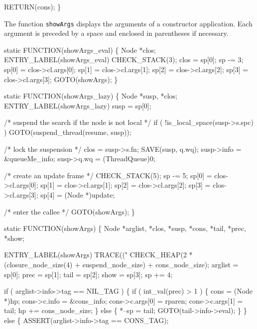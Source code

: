     RETURN(cons);
\}

\nwendcode{}\nwdocspar
The function \texttt{showArgs} displays the arguments of a constructor
application. Each argument is preceded by a space and enclosed in
parentheses if necessary.

\nwenddocs{}\plusendmoddef\nwstartdeflinemarkup{}\nwenddeflinemarkup
static
FUNCTION(showArgs_eval)
\{
    Node *clos;
 ENTRY_LABEL(showArgs_eval)
    CHECK_STACK(3);
    clos  = sp[0];
    sp   -= 3;
    sp[0] = clos->cl.args[0];
    sp[1] = clos->cl.args[1];
    sp[2] = clos->cl.args[2];
    sp[3] = clos->cl.args[3];
    GOTO(showArgs);
\}

static
FUNCTION(showArgs_lazy)
\{
    Node *susp, *clos;
 ENTRY_LABEL(showArgs_lazy)
    susp = sp[0];

    /* suspend the search if the node is not local */
    if ( !is_local_space(susp->s.spc) )
        GOTO(suspend_thread(resume, susp));

    /* lock the suspension */
    clos = susp->s.fn;
    SAVE(susp, q.wq);
    susp->info = &queueMe_info;
    susp->q.wq = (ThreadQueue)0;

    /* create an update frame */
    CHECK_STACK(5);
    sp   -= 5;
    sp[0] = clos->cl.args[0];
    sp[1] = clos->cl.args[1];
    sp[2] = clos->cl.args[2];
    sp[3] = clos->cl.args[3];
    sp[4] = (Node *)update;

    /* enter the callee */
    GOTO(showArgs);
\}

static
FUNCTION(showArgs)
\{
    Node *arglist, *clos, *susp, *cons, *tail, *prec, *show;

 ENTRY_LABEL(showArgs)
    TRACE(("%
    CHECK_HEAP(2 * (closure_node_size(4) + suspend_node_size)
               + cons_node_size);
    arglist = sp[0];
    prec    = sp[1];
    tail    = sp[2];
    show    = sp[3];
    sp     += 4;

    if ( arglist->info->tag == NIL_TAG )
    \{
        if ( int_val(prec) > 1 )
        \{
            cons            = (Node *)hp;
            cons->c.info    = &cons_info;
            cons->c.args[0] = rparen;
            cons->c.args[1] = tail;
            hp             += cons_node_size;
        \}
        else
        \{
            *--sp = tail;
            GOTO(tail->info->eval);
        \}
    \}
    else
    \{
        ASSERT(arglist->info->tag == CONS_TAG);

